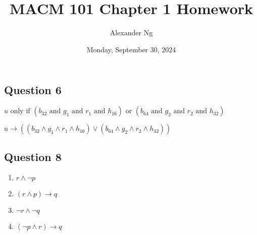 \documentclass[12pt]{article}
\begin{document}
\title{MACM 101 Chapter 1 Homework}
\author{Alexander Ng}
\date{Monday, September 30, 2024}

\maketitle 

\subsection*{Question 6}

$u \text{ only if } (b_{32} \text{ and } g_1 \text{ and } r_1 \text{ and } h_{16}) \text{ or } (b_{64} \text{ and } g_2 \text{ and } r_2 \text{ and } h_{32})$

$u \to ((b_{32} \land g_1 \land r_1 \land h_{16}) \lor (b_{64} \land g_2 \land r_2 \land h_{32}))$

\subsection*{Question 8}

\begin{enumerate}[label=(\alph*)]
\item $r \land \neg p$
\item $(r \land p) \to q$
\item $\neg r \land \neg q$
\item $(\neg p \land r) \to q$
\end{enumerate}
\end{document}
